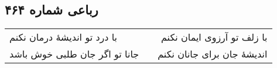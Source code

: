 \begin{center}
\section*{رباعی شماره ۴۶۴}
\label{sec:sh464}
\begin{longtable}{l p{0.5cm} r}
با درد تو اندیشهٔ درمان نکنم
&&
با زلف تو آرزوی ایمان نکنم
\\
جانا تو اگر جان طلبی خوش باشد
&&
اندیشهٔ جان برای جانان نکنم
\\
\end{longtable}
\end{center}
